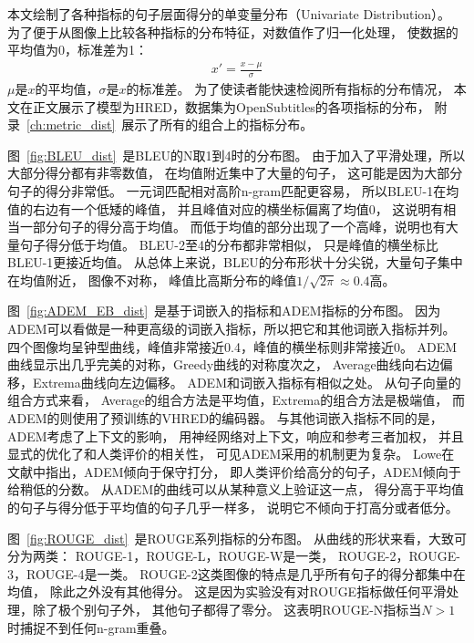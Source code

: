本文绘制了各种指标的句子层面得分的单变量分布（Univariate Distribution）。
为了便于从图像上比较各种指标的分布特征，对数值作了归一化处理，
使数据的平均值为0，标准差为1：
\begin{align}
    x' = \frac{x - \mu}{\sigma}
\end{align}
$\mu$是$x$的平均值，$\sigma$是$x$的标准差。
为了使读者能快速检阅所有指标的分布情况，
本文在正文展示了模型为HRED，数据集为OpenSubtitles的各项指标的分布，
附录~\ref{ch:metric_dist}~展示了所有的组合上的指标分布。


图~\ref{fig:BLEU_dist}~是BLEU的N取1到4时的分布图。
由于加入了平滑处理，所以大部分得分都有非零数值，
在均值附近集中了大量的句子，
这可能是因为大部分句子的得分非常低。
一元词匹配相对高阶n-gram匹配更容易，
所以BLEU-1在均值的右边有一个低矮的峰值，
并且峰值对应的横坐标偏离了均值0，
这说明有相当一部分句子的得分高于均值。
而低于均值的部分出现了一个高峰，说明也有大量句子得分低于均值。
BLEU-2至4的分布都非常相似，
只是峰值的横坐标比BLEU-1更接近均值。
从总体上来说，BLEU的分布形状十分尖锐，大量句子集中在均值附近，
图像不对称， 峰值比高斯分布的峰值$1 / \sqrt{2 \pi} \approx 0.4$高。


图~\ref{fig:ADEM_EB_dist}~是基于词嵌入的指标和ADEM指标的分布图。
因为ADEM可以看做是一种更高级的词嵌入指标，所以把它和其他词嵌入指标并列。
四个图像均呈钟型曲线，峰值非常接近0.4，峰值的横坐标则非常接近0。
ADEM曲线显示出几乎完美的对称，Greedy曲线的对称度次之，
Average曲线向右边偏移，Extrema曲线向左边偏移。
ADEM和词嵌入指标有相似之处。
从句子向量的组合方式来看，
Average的组合方法是平均值，Extrema的组合方法是极端值，
而ADEM的则使用了预训练的VHRED的编码器。
与其他词嵌入指标不同的是，ADEM考虑了上下文的影响，
用神经网络对上下文，响应和参考三者加权，
并且显式的优化了和人类评价的相关性，
可见ADEM采用的机制更为复杂。
Lowe在文献\cite{ADEM}中指出，ADEM倾向于保守打分，
即人类评价给高分的句子，ADEM倾向于给稍低的分数。
从ADEM的曲线可以从某种意义上验证这一点，
得分高于平均值的句子与得分低于平均值的句子几乎一样多，
说明它不倾向于打高分或者低分。


图~\ref{fig:ROUGE_dist}~是ROUGE系列指标的分布图。
从曲线的形状来看，大致可分为两类：
ROUGE-1，ROUGE-L，ROUGE-W是一类，
ROUGE-2，ROUGE-3，ROUGE-4是一类。
ROUGE-2这类图像的特点是几乎所有句子的得分都集中在均值，
除此之外没有其他得分。
这是因为实验没有对ROUGE指标做任何平滑处理，除了极个别句子外，
其他句子都得了零分。
这表明ROUGE-N指标当$N > 1$时捕捉不到任何n-gram重叠。

